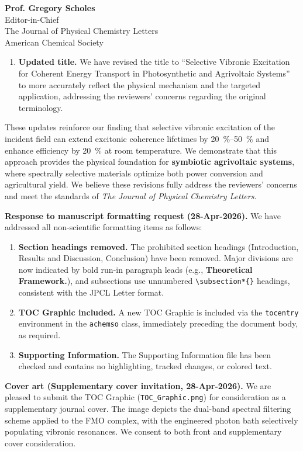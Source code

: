 \documentclass[11pt,a4paper]{letter}
\begin{document}
\begin{letter}{
\textbf{Prof. Gregory Scholes}\\
Editor-in-Chief\\
The Journal of Physical Chemistry Letters\\
American Chemical Society
}
\begin{enumerate}
\item \textbf{Updated title.} We have revised the title to ``Selective Vibronic Excitation for Coherent Energy Transport in Photosynthetic and Agrivoltaic Systems'' to more accurately reflect the physical mechanism and the targeted application, addressing the reviewers' concerns regarding the original terminology.
\end{enumerate}

These updates reinforce our finding that selective vibronic excitation of the incident field can extend excitonic coherence lifetimes by \SIrange{20}{50}{\percent} and enhance efficiency by \SI{20}{\percent} at room temperature. We demonstrate that this approach provides the physical foundation for \textbf{symbiotic agrivoltaic systems}, where spectrally selective materials optimize both power conversion and agricultural yield. We believe these revisions fully address the reviewers' concerns and meet the standards of \textit{The Journal of Physical Chemistry Letters}.

\textbf{Response to manuscript formatting request (28-Apr-2026).}
We have addressed all non-scientific formatting items as follows:
\begin{enumerate}
\item \textbf{Section headings removed.} The prohibited section headings (Introduction, Results and Discussion, Conclusion) have been removed. Major divisions are now indicated by bold run-in paragraph leads (e.g., \textbf{Theoretical Framework.}), and subsections use unnumbered \texttt{\textbackslash subsection*\{\}} headings, consistent with the JPCL Letter format.
\item \textbf{TOC Graphic included.} A new TOC Graphic is included via the \texttt{tocentry} environment in the \texttt{achemso} class, immediately preceding the document body, as required.
\item \textbf{Supporting Information.} The Supporting Information file has been checked and contains no highlighting, tracked changes, or colored text.
\end{enumerate}

\textbf{Cover art (Supplementary cover invitation, 28-Apr-2026).}
We are pleased to submit the TOC Graphic (\texttt{TOC\_Graphic.png}) for consideration as a supplementary journal cover. The image depicts the dual-band spectral filtering scheme applied to the FMO complex, with the engineered photon bath selectively populating vibronic resonances. We consent to both front and supplementary cover consideration.


\end{letter}
\end{document}
